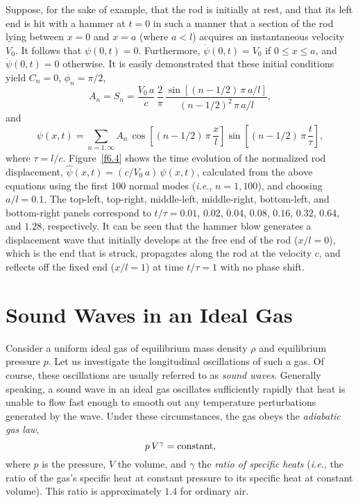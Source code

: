 Suppose, for the sake of example, that the rod is initially at rest, and that its left end is hit with a hammer at
$t=0$ in such a manner that a section of the rod lying between $x=0$ and $x=a$ (where $a<l$)
acquires an instantaneous velocity $V_0$. It follows that $\psi(0,t)=0$.
Furthermore, $\dot{\psi}(0,t)=V_0$ if $0\leq x\leq a$, and $\dot{\psi}(0,t)=0$ otherwise.
It is easily demonstrated that these initial conditions yield $C_n=0$, $\phi_n=\pi/2$, 
\begin{equation}
A_n  =S_n= \frac{V_0\,a}{c}\,\frac{2}{\pi}\,\frac{\sin[(n-1/2)\,\pi\,a/l]}{(n-1/2)^2\,\pi\,a/l},
\end{equation}
and
\begin{equation}
\psi(x,t) = \sum_{n=1,\infty} A_n\,\cos\left[(n-1/2)\,\pi\,\frac{x}{l}\right]\sin\left[(n-1/2)\,\pi\,\frac{t}{\tau}\right],
\end{equation}
where $\tau=l/c$. Figure~\ref{f6.4} shows the time evolution of the normalized rod
displacement, $\hat{\psi}(x,t)= (c/V_0\,a)\,\psi(x,t)$, calculated from the above equations using the first 100 normal modes ({\em i.e.}, $n=1,100$), and choosing $a/l=0.1$. 
The top-left, top-right, middle-left, middle-right, bottom-left, and bottom-right
panels correspond to $t/\tau=0.01$, $0.02$, $0.04$, $0.08$, $0.16$, $0.32$, $0.64$,
and $1.28$, respectively. It can be seen that the hammer blow
generates a  displacement wave  that initially develops at the free end of the rod ($x/l=0$),  which is
the end that is struck, propagates along the rod at the velocity $c$, and reflects off the fixed end  ($x/l=1$) at time  $t/\tau=1$ with
no phase shift.

\section{Sound Waves in an Ideal Gas}\label{s6.3}
Consider a  uniform ideal gas of equilibrium mass density $\rho$ and equilibrium pressure $p$. Let us
investigate the longitudinal oscillations of such a gas. Of course, these oscillations
are usually referred to as {\em sound waves}. Generally speaking, a sound wave
in an ideal gas
oscillates sufficiently rapidly that heat is unable to flow fast enough to smooth out any
temperature perturbations generated by the wave. Under these circumstances,
the gas obeys the {\em adiabatic gas law},
\begin{equation}\label{e6.30}
p\,V^\gamma = {\rm constant},
\end{equation}
where $p$ is the pressure, $V$ the volume, and $\gamma$ the {\em ratio of specific
heats}\/ ({\em i.e.}, the ratio of the gas's specific heat at constant pressure to its
specific heat at constant volume). This ratio is approximately $1.4$ for ordinary air.

